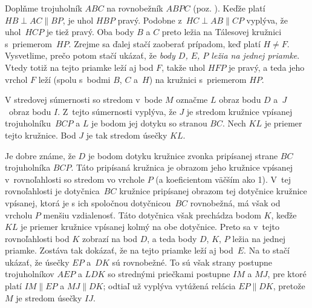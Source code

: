 {%
Doplňme trojuholník $ABC$ na rovnobežník $ABPC$ (poz. \obr{}). Keďže
platí $HB\perp AC\parallel BP$, je uhol $HBP$ pravý. Podobne
z~$HC\perp AB\parallel CP$ vyplýva, že uhol~$HCP$ je tiež pravý.
Oba body $B$ a $C$ preto ležia na Tálesovej kružnici
s~priemerom~$HP$.
%
Zrejme sa ďalej stačí zaoberať prípadom, keď platí $H\ne F$.
Vysvetlime, prečo potom stačí ukázať,
že {\it body $D$, $E$, $P$ ležia na jednej priamke}.
Vtedy totiž na tejto priamke leží aj bod $F$, takže uhol $HFP$
je pravý, a teda jeho vrchol $F$ leží
(spolu s~bodmi $B$, $C$ a~$H$) na kružnici s~priemerom $HP$.

V stredovej súmernosti so stredom v~bode $M$ označme
$L$ obraz bodu $D$ a~$J$~obraz bodu $I$. Z~tejto súmernosti vyplýva,
že $J$ je stredom kružnice vpísanej trojuholníku~$BCP$
a $L$ je bodom jej dotyku so stranou $BC$. Nech $KL$ je priemer
tejto kružnice. Bod $J$ je tak stredom úsečky $KL$.

Je dobre známe, že $D$ je bodom dotyku kružnice zvonka pripísanej strane
$BC$ trojuholníka $BCP$.
Táto pripísaná kružnica je obrazom jeho kružnice
vpísanej v~rovnoľahlosti so stredom vo vrchole $P$ (a
koeficientom väčším ako 1). V~tej rovnoľahlosti
je dotyčnica~$BC$ kružnice pripísanej obrazom tej dotyčnice kružnice vpísanej,
ktorá je s ich spoločnou dotyčnicou~$BC$ rovnobežná, má však od vrcholu
$P$ menšiu vzdialenosť. Táto dotyčnica však prechádza bodom $K$,
keďže $KL$ je priemer kružnice vpísanej kolmý na obe dotyčnice.
Preto sa v~tejto rovnoľahlosti bod $K$ zobrazí na bod
$D$, a teda body $D$, $K$, $P$ ležia na jednej priamke. Zostáva tak
dokázať, že na tejto priamke leží aj bod~$E$. Na to stačí
ukázať, že úsečky $EP$ a~$DK$ sú rovnobežné. To sú však
strany postupne trojuholníkov $AEP$ a $LDK$ so strednými priečkami postupne
$IM$ a $MJ$, pre ktoré platí $IM\parallel EP$ a $MJ\parallel DK$;
odtiaľ už vyplýva vytúžená relácia $EP\parallel DK$, pretože $M$ je stredom
úsečky $IJ$.
}

